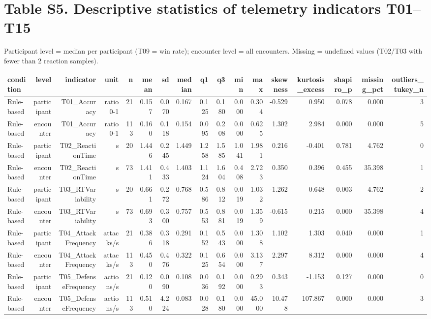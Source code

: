 \documentclass[10pt]{article}
\begin{document}
\section*{Table S5. Descriptive statistics of telemetry indicators T01--T15}
Participant level = median per participant (T09 = win rate); encounter level = all encounters. Missing = undefined values (T02/T03 with fewer than 2 reaction samples).

{\scriptsize\setlength{\tabcolsep}{3pt}\begin{longtable}{lrrrrrrrrrrrrrrrr}
\toprule
condition & level & indicator & unit & n & mean & sd & median & q1 & q3 & min & max & skewness & kurtosis\_excess & shapiro\_p & missing\_pct & outliers\_tukey\_n \\
\midrule
\endhead
Rule-based & participant & T01\_Accuracy & ratio 0-1 & 21 & 0.157 & 0.070 & 0.167 & 0.125 & 0.180 & 0.000 & 0.304 & -0.529 & 0.950 & 0.078 & 0.000 & 3 \\
Rule-based & encounter & T01\_Accuracy & ratio 0-1 & 113 & 0.160 & 0.118 & 0.154 & 0.095 & 0.208 & 0.000 & 0.625 & 1.302 & 2.984 & 0.000 & 0.000 & 5 \\
Rule-based & participant & T02\_ReactionTime & s & 20 & 1.446 & 0.245 & 1.449 & 1.258 & 1.585 & 1.041 & 1.981 & 0.216 & -0.401 & 0.781 & 4.762 & 0 \\
Rule-based & encounter & T02\_ReactionTime & s & 73 & 1.411 & 0.433 & 1.403 & 1.124 & 1.604 & 0.408 & 2.723 & 0.350 & 0.396 & 0.455 & 35.398 & 1 \\
Rule-based & participant & T03\_RTVariability & s & 20 & 0.661 & 0.272 & 0.768 & 0.586 & 0.812 & 0.019 & 1.032 & -1.262 & 0.648 & 0.003 & 4.762 & 2 \\
Rule-based & encounter & T03\_RTVariability & s & 73 & 0.693 & 0.300 & 0.757 & 0.553 & 0.881 & 0.019 & 1.359 & -0.615 & 0.215 & 0.000 & 35.398 & 4 \\
Rule-based & participant & T04\_AttackFrequency & attacks/s & 21 & 0.386 & 0.318 & 0.291 & 0.152 & 0.543 & 0.000 & 1.308 & 1.102 & 1.303 & 0.040 & 0.000 & 1 \\
Rule-based & encounter & T04\_AttackFrequency & attacks/s & 113 & 0.450 & 0.476 & 0.322 & 0.125 & 0.654 & 0.000 & 3.137 & 2.297 & 8.312 & 0.000 & 0.000 & 4 \\
Rule-based & participant & T05\_DefenseFrequency & actions/s & 21 & 0.120 & 0.090 & 0.108 & 0.036 & 0.192 & 0.000 & 0.293 & 0.343 & -1.153 & 0.127 & 0.000 & 0 \\
Rule-based & encounter & T05\_DefenseFrequency & actions/s & 113 & 0.510 & 4.224 & 0.083 & 0.028 & 0.180 & 0.000 & 45.000 & 10.478 & 107.867 & 0.000 & 0.000 & 3 \\

\end{longtable}}
\end{document}
